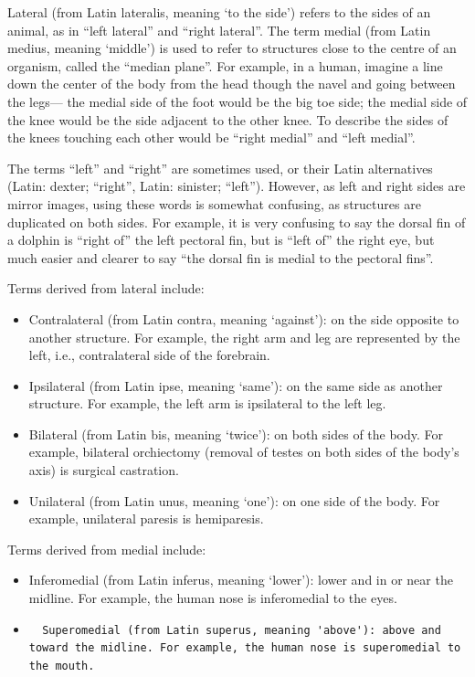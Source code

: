 Lateral (from Latin lateralis, meaning `to the side') refers to the sides of an animal, as in ``left lateral'' and ``right lateral''. The term medial (from Latin medius, meaning `middle') is used to refer to structures close to the centre of an organism, called the ``median plane''. For example, in a human, imagine a line down the center of the body from the head though the navel and going between the legs--- the medial side of the foot would be the big toe side; the medial side of the knee would be the side adjacent to the other knee. To describe the sides of the knees touching each other would be ``right medial'' and ``left medial''.

The terms ``left'' and ``right'' are sometimes used, or their Latin alternatives (Latin: dexter; ``right'', Latin: sinister; ``left''). However, as left and right sides are mirror images, using these words is somewhat confusing, as structures are duplicated on both sides. For example, it is very confusing to say the dorsal fin of a dolphin is ``right of'' the left pectoral fin, but is ``left of'' the right eye, but much easier and clearer to say ``the dorsal fin is medial to the pectoral fins''.

Terms derived from lateral include:

\begin{itemize}
\tightlist
\item
  Contralateral (from Latin contra, meaning `against'): on the side opposite to another structure. For example, the right arm and leg are represented by the left, i.e., contralateral side of the forebrain.
\item
  Ipsilateral (from Latin ipse, meaning `same'): on the same side as another structure. For example, the left arm is ipsilateral to the left leg.
\item
  Bilateral (from Latin bis, meaning `twice'): on both sides of the body. For example, bilateral orchiectomy (removal of testes on both sides of the body's axis) is surgical castration.
\item
  Unilateral (from Latin unus, meaning `one'): on one side of the body. For example, unilateral paresis is hemiparesis.
\end{itemize}

Terms derived from medial include:

\begin{itemize}
\item
  Inferomedial (from Latin inferus, meaning `lower'): lower and in or near the midline. For example, the human nose is inferomedial to the eyes.
\item
\begin{verbatim}
  Superomedial (from Latin superus, meaning 'above'): above and toward the midline. For example, the human nose is superomedial to the mouth.
\end{verbatim}
\end{itemize}

